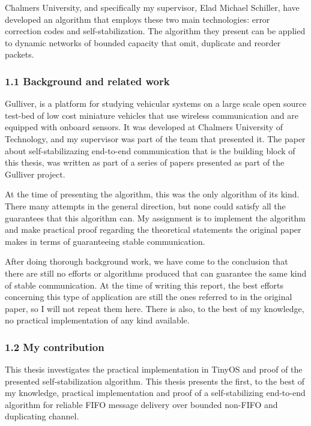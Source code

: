 Chalmers University, and specifically my supervisor, Elad Michael
Schiller, have developed an algorithm that employs these two main
technologies: error correction codes and self-stabilization. The
algorithm they present can be applied to dynamic networks of bounded
capacity that omit, duplicate and reorder packets.

\subsubsection{1.1 Background and related
work}\label{background-and-related-work}

Gulliver\cite{Pahlavan}, is a platform for studying vehicular systems on
a large scale open source test-bed of low cost miniature vehicles that
use wireless communication and are equipped with onboard sensors. It was
developed at Chalmers University of Technology, and my supervisor was
part of the team that presented it. The paper about self-stabilizazing
end-to-end communication that is the building block of this thesis, was
written as part of a series of papers presented as part of the Gulliver
project.

At the time of presenting the algorithm, this was the only algorithm of
its kind. There many attempts in the general direction, but none could
satisfy all the guarantees that this algorithm can\cite{dolev2012self}.
My assignment is to implement the algorithm and make practical proof
regarding the theoretical statements the original paper makes in terms
of guaranteeing stable communication.

After doing thorough background work, we have come to the conclusion
that there are still no efforts or algorithms produced that can
guarantee the same kind of stable communication. At the time of writing
this report, the best efforts concerning this type of application are
still the ones referred to in the original paper, so I will not repeat
them here. There is also, to the best of my knowledge, no practical
implementation of any kind available.

\subsubsection{1.2 My contribution}\label{my-contribution}

This thesis investigates the practical implementation in TinyOS and
proof of the presented self-stabilization algorithm. This thesis
presents the first, to the best of my knowledge, practical
implementation and proof of a self-stabilizing end-to-end algorithm for
reliable FIFO message delivery over bounded non-FIFO and duplicating
channel.
